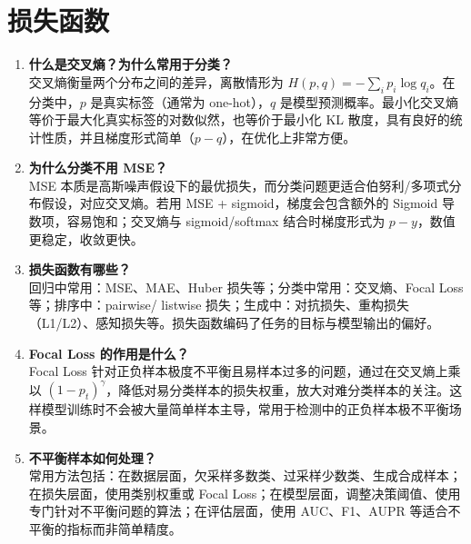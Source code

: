 \documentclass{article}
\begin{document}
\section{损失函数}
\begin{enumerate}
\item \textbf{什么是交叉熵？为什么常用于分类？}\\
交叉熵衡量两个分布之间的差异，离散情形为 $H(p,q)=-\sum_i p_i \log q_i$。在分类中，$p$ 是真实标签（通常为 one-hot），$q$ 是模型预测概率。最小化交叉熵等价于最大化真实标签的对数似然，也等价于最小化 KL 散度，具有良好的统计性质，并且梯度形式简单（$p-q$），在优化上非常方便。

\item \textbf{为什么分类不用 MSE？}\\
MSE 本质是高斯噪声假设下的最优损失，而分类问题更适合伯努利/多项式分布假设，对应交叉熵。若用 MSE + sigmoid，梯度会包含额外的 Sigmoid 导数项，容易饱和；交叉熵与 sigmoid/softmax 结合时梯度形式为 $p-y$，数值更稳定，收敛更快。

\item \textbf{损失函数有哪些？}\\
回归中常用：MSE、MAE、Huber 损失等；分类中常用：交叉熵、Focal Loss 等；排序中：pairwise/ listwise 损失；生成中：对抗损失、重构损失（L1/L2）、感知损失等。损失函数编码了任务的目标与模型输出的偏好。

\item \textbf{Focal Loss 的作用是什么？}\\
Focal Loss 针对正负样本极度不平衡且易样本过多的问题，通过在交叉熵上乘以 $(1-p_t)^\gamma$，降低对易分类样本的损失权重，放大对难分类样本的关注。这样模型训练时不会被大量简单样本主导，常用于检测中的正负样本极不平衡场景。

\item \textbf{不平衡样本如何处理？}\\
常用方法包括：在数据层面，欠采样多数类、过采样少数类、生成合成样本；在损失层面，使用类别权重或 Focal Loss；在模型层面，调整决策阈值、使用专门针对不平衡问题的算法；在评估层面，使用 AUC、F1、AUPR 等适合不平衡的指标而非简单精度。
\end{enumerate}
\end{document}
